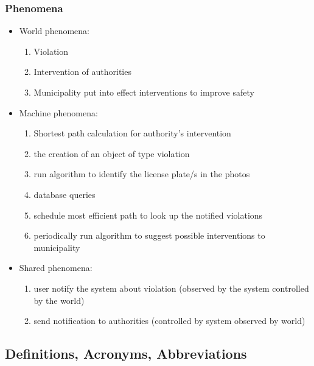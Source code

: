 \subsubsection{Phenomena}
\begin{itemize}
\item
World phenomena:
\begin{enumerate}
\item
Violation
\item
Intervention of authorities
\item
Municipality put into effect interventions to improve safety
\end{enumerate}
\item
Machine phenomena:	
\begin{enumerate}
\item
Shortest path calculation for authority’s intervention
\item
the creation of an object of type violation
\item
run algorithm to identify the license plate/s in the photos
\item
database queries
\item
schedule most efficient path to look up the notified violations
\item
periodically run algorithm to suggest possible interventions to municipality
\end{enumerate}
\item
Shared phenomena:
\begin{enumerate}
\item
user notify the system about violation (observed by the system controlled by the world)
\item
send notification to authorities (controlled by system observed by world)
\end{enumerate}
\end{itemize}
\subsection{Definitions, Acronyms, Abbreviations}

